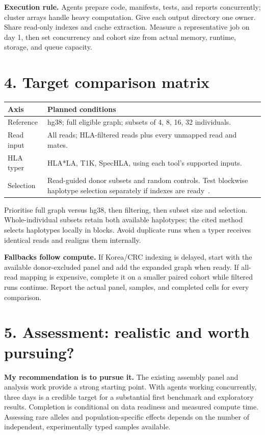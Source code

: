 \documentclass[11pt,a4paper]{article}
\begin{document}
\textbf{Execution rule.} Agents prepare code, manifests, tests, and reports
concurrently; cluster arrays handle heavy computation. Give each output directory
one owner. Share read-only indexes and cache extraction. Measure a representative
job on day 1, then set concurrency and cohort size from actual memory, runtime,
storage, and queue capacity.

\section*{4. Target comparison matrix}
\begin{tabularx}{\textwidth}{@{}p{3.0cm}X@{}}
\toprule
Axis & Planned conditions \\
\midrule
Reference & hg38; full eligible graph; subsets of 4, 8, 16, 32 individuals. \\
Read input & All reads; HLA-filtered reads plus every unmapped read and mates. \\
HLA typer & HLA*LA, T1K, SpecHLA, using each tool's supported inputs. \\
Selection & Read-guided donor subsets and random controls. Test blockwise
haplotype selection separately if indexes are ready~\cite{personal}. \\
\bottomrule
\end{tabularx}

Prioritise full graph versus hg38, then filtering, then subset size and selection.
Whole-individual subsets retain both available haplotypes; the cited method
selects haplotypes locally in blocks. Avoid duplicate runs when a typer receives
identical reads and realigns them internally.

\textbf{Fallbacks follow compute.} If Korea/CRC indexing is delayed, start with
the available donor-excluded panel and add the expanded graph when ready.
If all-read mapping is expensive, complete it on a smaller paired cohort while
filtered runs continue. Report the actual panel, samples, and completed cells
for every comparison.

\newpage
\section*{5. Assessment: realistic and worth pursuing?}
\textbf{My recommendation is to pursue it.} The existing assembly panel and
analysis work provide a strong starting point. With agents working concurrently,
three days is a credible target for a substantial first benchmark and exploratory
results. Completion is conditional on data readiness and measured compute time.
Assessing rare alleles and population-specific effects depends on the number
of independent, experimentally typed samples available.
\end{document}

